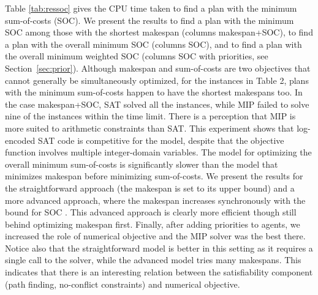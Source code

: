 \documentclass[conference]{IEEEtran}
\begin{document}
Table \ref{tab:ressoc} gives the CPU time taken to find a plan with the minimum sum-of-costs (SOC). We present the results to find a plan with the minimum SOC among those with the shortest makespan (columns makespan+SOC), to find a plan with the overall minimum SOC (columns SOC), and to find a plan with the overall minimum weighted SOC (columns SOC with priorities, see Section~\ref{sec:prior}). Although makespan and sum-of-costs are two objectives that cannot generally be simultaneously optimized, for the instances in Table 2, plans with the minimum sum-of-costs happen to have the shortest makespans too. In the case makespan+SOC, SAT solved all the instances, while MIP failed to solve nine of the instances within the time limit. There  is a perception that MIP is more suited to arithmetic constraints than SAT. This experiment shows that log-encoded SAT code \cite{ZhouK17} is competitive for the model, despite that the objective function involves multiple integer-domain variables. The model for optimizing the overall minimum sum-of-costs is significantly slower than the model that minimizes makespan before minimizing sum-of-costs. We present the results for the straightforward approach (the makespan is set to its upper bound) and a more advanced approach, where the makespan increases synchronously with the bound for SOC \cite{SurynekFSB16}. This advanced approach is clearly more efficient though still behind optimizing makespan first. Finally, after adding priorities to agents, we increased the role of numerical objective and the MIP solver was the best there. Notice also that the straightforward model is better in this setting as it requires a single call to the solver, while the advanced model tries many makespans. This indicates that there is an interesting relation between the satisfiability component (path finding, no-conflict constraints) and numerical objective.
\end{document}
